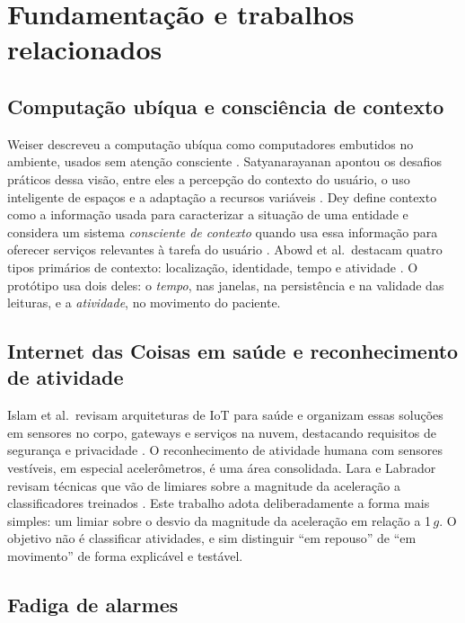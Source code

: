 \documentclass[12pt,a4paper]{article}
\begin{document}
\section{Fundamentação e trabalhos relacionados}\label{sec:fund}

\subsection{Computação ubíqua e consciência de contexto}

Weiser descreveu a computação ubíqua como computadores embutidos no ambiente, usados sem atenção consciente \cite{weiser1991}.
Satyanarayanan apontou os desafios práticos dessa visão, entre eles a percepção do contexto do usuário, o uso inteligente de espaços e a adaptação a recursos variáveis \cite{satya2001}.
Dey define contexto como a informação usada para caracterizar a situação de uma entidade e considera um sistema \emph{consciente de contexto} quando usa essa informação para oferecer serviços relevantes à tarefa do usuário \cite{dey2001}.
Abowd et al.\ destacam quatro tipos primários de contexto: localização, identidade, tempo e atividade \cite{abowd1999}.
O protótipo usa dois deles: o \emph{tempo}, nas janelas, na persistência e na validade das leituras, e a \emph{atividade}, no movimento do paciente.

\subsection{Internet das Coisas em saúde e reconhecimento de atividade}

Islam et al.\ revisam arquiteturas de IoT para saúde e organizam essas soluções em sensores no corpo, gateways e serviços na nuvem, destacando requisitos de segurança e privacidade \cite{islam2015}.
O reconhecimento de atividade humana com sensores vestíveis, em especial acelerômetros, é uma área consolidada.
Lara e Labrador revisam técnicas que vão de limiares sobre a magnitude da aceleração a classificadores treinados \cite{lara2013}.
Este trabalho adota deliberadamente a forma mais simples: um limiar sobre o desvio da magnitude da aceleração em relação a 1\,$g$.
O objetivo não é classificar atividades, e sim distinguir ``em repouso'' de ``em movimento'' de forma explicável e testável.

\subsection{Fadiga de alarmes}
\end{document}
